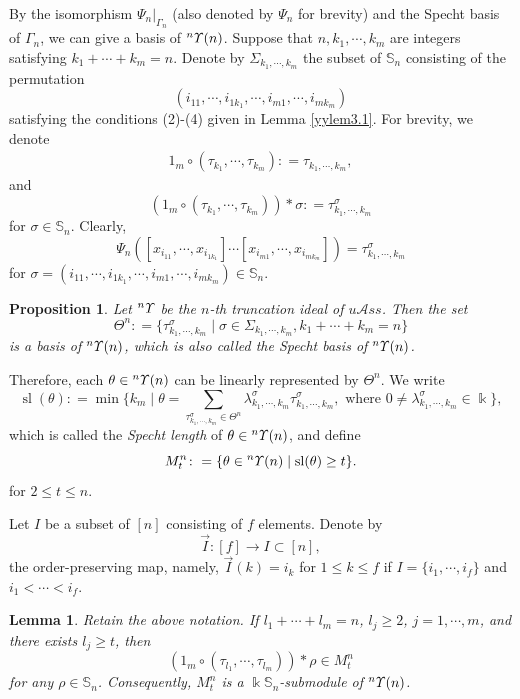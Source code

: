\documentclass{amsart}
\newtheorem{lem}[thm]{Lemma}
\newtheorem{prop}[thm]{Proposition}
\theoremstyle{definition}
\theoremstyle{remark}
\numberwithin{equation}{section}
\def\S{\mathbb{S}}
\newcommand{\up}[1]{{^{#1}{\it \!\Upsilon}}}
\def\la{\lambda}
\def \uas{u\mathcal{A}ss}
\def \S{\mathbb{S}}
\def\sl{\operatorname{sl}}
\begin{document}
By the isomorphism $\Psi_n|_{\Gamma_n}$ (also denoted by 
$\Psi_n$ for brevity) and the Specht basis of $\Gamma_n$, 
we can give a basis of $\up{n}(n)$. Suppose that 
$n, k_1, \cdots, k_m$ are integers satisfying $k_1+\cdots+k_m=n$.
Denote by $\Sigma_{k_1, \cdots, k_m}$ the subset  of $\S_n$ 
consisting of the permutation 
\[(i_{11}, \cdots, i_{1k_1},\cdots, i_{m1}, \cdots, i_{mk_m})\]
satisfying the conditions (2)-(4) given in Lemma \ref{yylem3.1}.
For brevity, we denote 
\begin{align}\label{E3.2.1}\tag{E3.2.1}
1_m\circ(\tau_{k_1},  \cdots, \tau_{k_m})\colon 
=\tau_{k_1, \cdots, k_m},
\end{align}
and 
\[(1_m\circ(\tau_{k_1},  \cdots, \tau_{k_m}))\ast \sigma\colon 
=\tau_{k_1, \cdots,  k_m}^\sigma\]
for $\sigma\in\S_n$.
Clearly, 
\[\Psi_n([x_{i_{11}}, \cdots, x_{i_{1k_1}}]\cdots
[x_{i_{m1}}, \cdots, x_{i_{mk_m}}])
=\tau_{k_1, \cdots, k_m}^\sigma\]
for $\sigma=(i_{11}, \cdots, i_{1k_1},\cdots, i_{m1}, 
\cdots, i_{mk_m})\in \S_n$.




\begin{prop}
\label{yypro3.3}
Let $\up{n}$ be the $n$-th truncation ideal of $\uas$. 
Then the set 
\[\Theta^n\colon=\{\tau_{k_1, \cdots, k_m}^\sigma\mid 
\sigma\in\Sigma_{k_1, \cdots, k_m}, k_1+\cdots+k_m=n\}\]
is a basis of $\up{n}(n)$, which is also called the 
\textit{Specht basis} of $\up{n}(n)$.
\end{prop}

Therefore, each $\theta\in \up{n}(n)$ can be linearly 
represented by $\Theta^n$. We write
\[\sl(\theta)\colon=\min\{k_m\mid \theta
=\sum_{\tau_{k_1, \cdots, k_m}^\sigma\in \Theta^n}
\la^\sigma_{k_1, \cdots, k_m}\tau_{k_1, \cdots, k_m}^\sigma,  
{\text{ where }} 0\neq \la^\sigma_{k_1, \cdots, k_m}\in \Bbbk\},\]
which is called the \textit{Specht length} of 
$\theta\in \up{n}(n)$, and define 
\[M^n_t\colon =\{\theta\in \up{n}(n)\mid \sl(\theta)\ge t\}.\] 
for $2\le t\le n$.

Let $I$ be a subset of $[n]$ consisting of $f$ elements. 
Denote by
\[\overrightarrow{I}\colon [f]\to I\subset [n], \]
the order-preserving map, namely, $\overrightarrow{I}(k)=i_k$ 
for $1\le k\le f$ if $I=\{i_1,\cdots, i_f\}$ and $i_1<\cdots<i_f$.

\begin{lem}
	\label{yylem3.4}
	Retain the above notation.  If $l_1+\cdots+l_m=n$, $l_j\ge 2$, 
	$j=1, \cdots, m$, and there exists $l_j\ge t$, then 
	\[(1_m\circ (\tau_{l_1}, \cdots, \tau_{l_m}))\ast\rho \in M_t^n\]
	for any $\rho\in \S_n$. 
	Consequently, $M_t^n$ is a $\Bbbk\S_n$-submodule of $\up{n}(n)$.
\end{lem}
\end{document}
